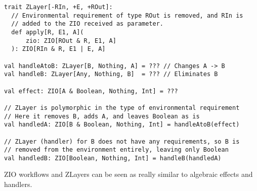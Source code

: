 \begin{algorithm}

\begin{verbatim}
trait ZLayer[-RIn, +E, +ROut]:
  // Environmental requirement of type ROut is removed, and RIn is
  // added to the ZIO received as parameter.
  def apply[R, E1, A](
      zio: ZIO[ROut & R, E1, A]
  ): ZIO[RIn & R, E1 | E, A]

val handleAtoB: ZLayer[B, Nothing, A] = ??? // Changes A -> B
val handleB: ZLayer[Any, Nothing, B]  = ??? // Eliminates B

val effect: ZIO[A & Boolean, Nothing, Int] = ???

// ZLayer is polymorphic in the type of environmental requirement
// Here it removes B, adds A, and leaves Boolean as is
val handledA: ZIO[B & Boolean, Nothing, Int] = handleAtoB(effect)

// ZLayer (handler) for B does not have any requirements, so B is
// removed from the environment entirely, leaving only Boolean
val handledB: ZIO[Boolean, Nothing, Int] = handleB(handledA)
\end{verbatim}

\caption{ZIO workflows and ZLayers can be seen as really similar to algebraic effects and handlers. \label{zio:zlayer-eff-handler}}
\end{algorithm}